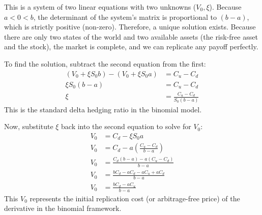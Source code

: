 This is a system of two linear equations with two unknowns ($V_0, \xi$). Because $a < 0 < b$, the determinant of the system's matrix is proportional to $(b-a)$, which is strictly positive (non-zero). Therefore, a unique solution exists. Because there are only two states of the world and two available assets (the risk-free asset and the stock), the market is complete, and we can replicate any payoff perfectly.

To find the solution, subtract the second equation from the first:
\begin{align*}
(V_0 + \xi S_0 b) - (V_0 + \xi S_0 a) &= C_u - C_d \\
\xi S_0 (b - a) &= C_u - C_d \\
\xi &= \frac{C_u - C_d}{S_0(b - a)}
\end{align*}
This is the standard delta hedging ratio in the binomial model.

Now, substitute $\xi$ back into the second equation to solve for $V_0$:
\begin{align*}
V_0 &= C_d - \xi S_0 a \\
V_0 &= C_d - a \left( \frac{C_u - C_d}{b - a} \right) \\
V_0 &= \frac{C_d(b - a) - a(C_u - C_d)}{b - a} \\
V_0 &= \frac{b C_d - a C_d - a C_u + a C_d}{b - a} \\
V_0 &= \frac{b C_d - a C_u}{b - a}
\end{align*}
This $V_0$ represents the initial replication cost (or arbitrage-free price) of the derivative in the binomial framework.